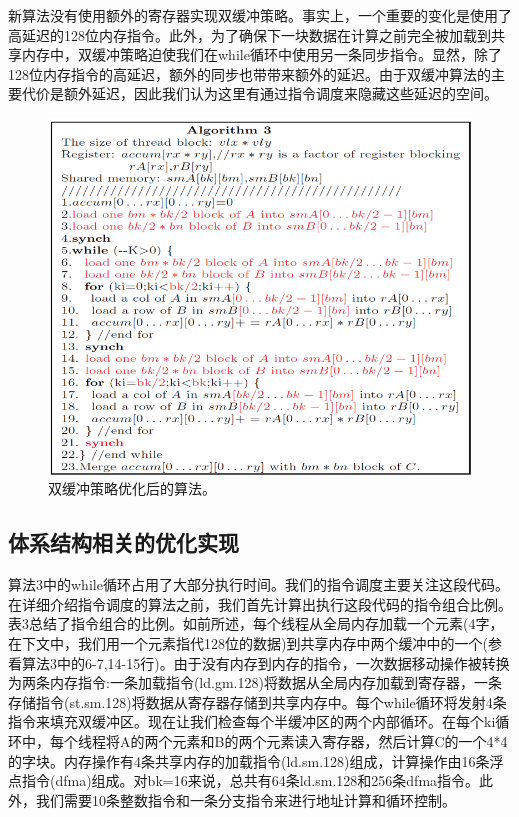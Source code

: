 \begin{flushleft}
新算法没有使用额外的寄存器实现双缓冲策略。事实上，一个重要的变化是使用了高延迟的128位内存指令。此外，为了确保下一块数据在计算之前完全被加载到共享内存中，双缓冲策略迫使我们在while循环中使用另一条同步指令。显然，除了128位内存指令的高延迟，额外的同步也带带来额外的延迟。由于双缓冲算法的主要代价是额外延迟，因此我们认为这里有通过指令调度来隐藏这些延迟的空间。
\begin{figure}[htbp]
	\begin{center}
		\includegraphics[scale=0.8]{Img/Chap_Algorithm/DGEMMPipeAlgo}
		\caption{双缓冲策略优化后的算法。} \label{fig:DGEMMPipeAlgo}
	\end{center}
\end{figure}


\subsection{体系结构相关的优化实现}
算法3中的while循环占用了大部分执行时间。我们的指令调度主要关注这段代码。在详细介绍指令调度的算法之前，我们首先计算出执行这段代码的指令组合比例。表3总结了指令组合的比例。如前所述，每个线程从全局内存加载一个元素(4字，在下文中，我们用一个元素指代128位的数据)到共享内存中两个缓冲中的一个(参看算法3中的6-7,14-15行)。由于没有内存到内存的指令，一次数据移动操作被转换为两条内存指令:一条加载指令(ld.gm.128)将数据从全局内存加载到寄存器，一条存储指令(st.sm.128)将数据从寄存器存储到共享内存中。每个while循环将发射4条指令来填充双缓冲区。现在让我们检查每个半缓冲区的两个内部循环。在每个ki循环中，每个线程将A的两个元素和B的两个元素读入寄存器，然后计算C的一个4*4的字块。内存操作有4条共享内存的加载指令(ld.sm.128)组成，计算操作由16条浮点指令(dfma)组成。对bk=16来说，总共有64条ld.sm.128和256条dfma指令。此外，我们需要10条整数指令和一条分支指令来进行地址计算和循环控制。


\end{flushleft}
